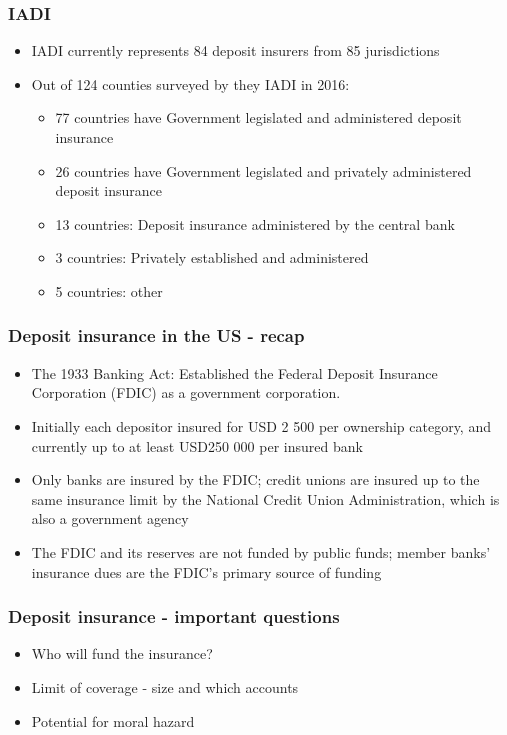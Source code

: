 \documentclass[11pt]{beamer}
\begin{document}
\begin{frame}
\frametitle{IADI}
\begin{itemize}
\item IADI currently represents 84 deposit insurers from 85 jurisdictions
\item Out of 124 counties surveyed by they IADI in 2016:
\begin{itemize}
\item 77 countries have Government legislated and administered deposit insurance
\item 26 countries have Government legislated and privately administered deposit insurance
\item 13 countries: Deposit insurance administered by the central bank
\item 3 countries: Privately established and administered
\item 5 countries: other
\end{itemize}
\end{itemize}
\end{frame}


\begin{frame}
\frametitle{Deposit insurance in the US - recap}
\begin{itemize}
\item The 1933 Banking Act: Established the Federal Deposit Insurance Corporation (FDIC) as a government corporation.
\item Initially each depositor insured for USD 2 500 per ownership category, and currently up to at least USD250 000 per insured bank
\item Only banks are insured by the FDIC; credit unions are insured up to the same insurance limit by the National Credit Union Administration, which is also a government agency
\item The FDIC and its reserves are not funded by public funds; member banks' insurance dues are the FDIC's primary source of funding
\end{itemize}
\end{frame}

\begin{frame}
\frametitle{Deposit insurance - important questions}
\begin{itemize}
\item Who will fund the insurance?
\item Limit of coverage - size and which accounts
\item Potential for moral hazard
\end{itemize}
\end{frame}
\end{document}
